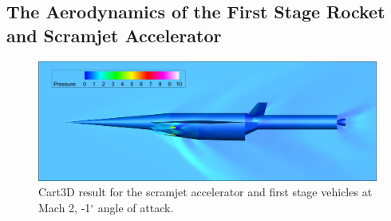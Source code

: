   \subsection{The Aerodynamics of the First Stage Rocket and Scramjet Accelerator}\label{sec:firststageaero}
   \begin{figure}[ht]
   	\centering
   	\includegraphics[width=0.8\linewidth]{figures/3_vehicle_design/CARTcontour}
   	\caption{Cart3D result for the scramjet accelerator and first stage vehicles at Mach 2, -1$^\circ$ angle of attack.}
   	\label{fig:CARTcontour}
   \end{figure}
